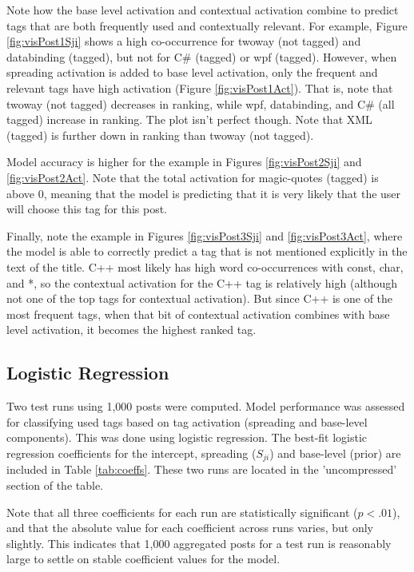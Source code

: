 \documentclass[10pt,letterpaper]{article}
\begin{document}
Note how the base level activation and contextual activation combine to predict tags that are both frequently used and contextually relevant.
For example, Figure \ref{fig:visPost1Sji} shows a high co-occurrence for twoway (not tagged) and databinding (tagged), but not for C\# (tagged) or wpf (tagged).
However, when spreading activation is added to base level activation, only the frequent and relevant tags have high activation (Figure \ref{fig:visPost1Act}).
That is, note that twoway (not tagged) decreases in ranking, while wpf, databinding, and C\# (all tagged) increase in ranking.
The plot isn't perfect though.
Note that XML (tagged) is further down in ranking than twoway (not tagged).

Model accuracy is higher for the example in Figures \ref{fig:visPost2Sji} and \ref{fig:visPost2Act}.
Note that the total activation for magic-quotes (tagged) is above 0, meaning that the model is predicting that it is very likely that the user will choose this tag for this post.

Finally, note the example in Figures \ref{fig:visPost3Sji} and \ref{fig:visPost3Act}, where the model is able to correctly predict a tag that is not mentioned explicitly in the text of the title.
C++ most likely has high word co-occurrences with const, char, and *, so the contextual activation for the C++ tag is relatively high (although not one of the top tags for contextual activation).
But since C++ is one of the most frequent tags, when that bit of contextual activation combines with base level activation, it becomes the highest ranked tag.

\subsection{Logistic Regression}

Two test runs using 1,000 posts were computed.
Model performance was assessed for classifying used tags based on tag activation (spreading and base-level components).
This was done using logistic regression.
The best-fit logistic regression coefficients for the intercept, spreading ($S_{ji}$) and base-level (prior) are included in Table \ref{tab:coeffs}.
These two runs are located in the 'uncompressed' section of the table.

Note that all three coefficients for each run are statistically significant ($p<.01$), and that the absolute value for each coefficient across runs varies, but only slightly.
This indicates that 1,000 aggregated posts for a test run is reasonably large to settle on stable coefficient values for the model.
\end{document}
